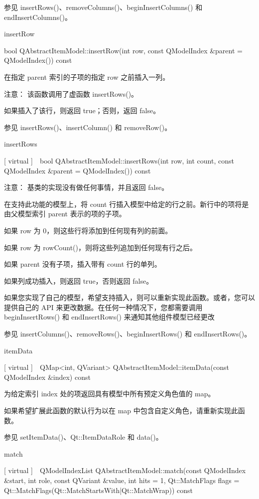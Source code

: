 参见 insertRows()、removeColumns()、beginInsertColumns() 和 endInsertColumns()。

insertRow

bool QAbstractItemModel::insertRow(int row, const QModelIndex \&parent = QModelIndex()) const

在指定 parent 索引的子项的指定 row 之前插入一列。

注意： 该函数调用了虚函数 insertRows()。

如果插入了该行，则返回 true；否则，返回 false。

参见 insertRows()、insertColumn() 和 removeRow()。

insertRows

[ virtual ] bool QAbstractItemModel::insertRows(int row, int count, const QModelIndex \&parent = QModelIndex()) const

注意： 基类的实现没有做任何事情，并且返回 false。

在支持此功能的模型上，将 count 行插入模型中给定的行之前。新行中的项将是由父模型索引 parent 表示的项的子项。

如果 row 为 0，则这些行将添加到任何现有列的前面。

如果 row 为 rowCount()，则将这些列追加到任何现有行之后。

如果 parent 没有子项，插入带有 count 行的单列。

如果列成功插入，则返回 true，否则返回 false。

如果您实现了自己的模型，希望支持插入，则可以重新实现此函数。或者，您可以提供自己的 API 来更改数据。在任何一种情况下，您都需要调用 beginInsertRows() 和 endInsertRows() 来通知其他组件模型已经更改

参见 insertColumns()、removeRows()、beginInsertRows() 和 endInsertRows()。

itemData

[ virtual ] QMap<int, QVariant> QAbstractItemModel::itemData(const QModelIndex \&index) const

为给定索引 index 处的项返回具有模型中所有预定义角色值的 map。

如果希望扩展此函数的默认行为以在 map 中包含自定义角色，请重新实现此函数。

参见 setItemData()、Qt::ItemDataRole 和 data()。

match

[ virtual ] QModelIndexList QAbstractItemModel::match(const QModelIndex \&start, int role, const QVariant \&value, int hits = 1, Qt::MatchFlags flags = Qt::MatchFlags(Qt::MatchStartsWith|Qt::MatchWrap)) const

